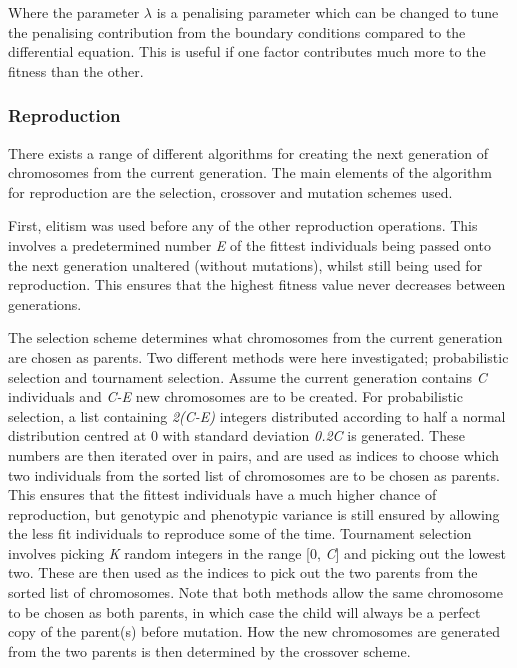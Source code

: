 \documentclass[multicolumn, 9pt]{extarticle}
\begin{document}
Where the parameter $\lambda$ is a penalising parameter which can be changed to tune the penalising contribution from the boundary conditions compared to the differential equation. This is useful if one factor contributes much more to the fitness than the other.

\subsubsection{Reproduction}
There exists a range of different algorithms for creating the next generation of chromosomes from the current generation. The main elements  of the algorithm for reproduction are the selection, crossover and mutation schemes used.

First, elitism was used before any of the other reproduction operations. This involves a predetermined number  \textit{E} of the fittest individuals being passed onto the next generation unaltered (without mutations), whilst still being used for reproduction. This ensures that the highest fitness value never decreases between generations.

The selection scheme determines what chromosomes from the current generation are chosen as parents. Two different methods were here investigated; probabilistic selection and tournament selection. Assume the current generation contains \textit{C} individuals and \textit{C-E} new chromosomes are to be created. For probabilistic selection, a list containing \textit{2(C-E)} integers distributed according to half a normal distribution centred at 0 with standard deviation \textit{0.2C} is generated. These numbers are then iterated over in pairs, and are used as indices to choose which two individuals from the sorted list of chromosomes are to be chosen as parents. This ensures that the fittest individuals have a much higher chance of reproduction, but genotypic and phenotypic variance is still ensured by allowing the less fit individuals to reproduce some of the time. Tournament selection involves picking \textit{K} random integers in the range [0, \textit{C}] and picking out the lowest two. These are then used as the indices to pick out the two parents from the sorted list of chromosomes. Note that both methods allow the same chromosome to be chosen as both parents, in which case the child will always be a perfect copy of the parent(s) before mutation. How the new chromosomes are generated from the two parents is then determined by the crossover scheme.
\end{document}
